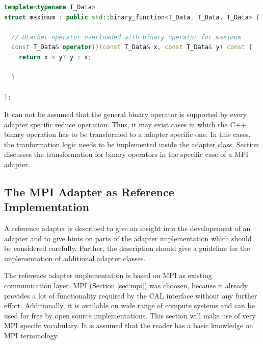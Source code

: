 \begin{lstlisting}[language=C++, breaklines=false, label={lst:binary_function}]
template<typename T_Data>
struct maximum : public std::binary_function<T_Data, T_Data, T_Data> {

  // Bracket operator overloaded with binary operator for maximum
  const T_Data& operator()(const T_Data& x, const T_Data& y) const {
    return x < y? y : x;

  }

};
\end{lstlisting}

It can not be assumed that the general binary operator is supported by
every adapter specific reduce operation.  Thus, it may exist cases in
which the C++ binary operation has to be transformed to a adapter
specific one. In this cases, the tranformation logic needs to be
implemented inside the adapter class. Section \label{sec:bin_operator}
discusses the transformation for binary operators in the specific case
of a MPI adapter.

\subsection{The MPI Adapter as Reference Implementation}
\label{sec:cal_mpi_adapter}

A reference adapter is described to give an insight into the
developement of an adapter and to give hints on parts of the adapter
implementation which should be considered carefully.  Further, the
description should give a guideline for the implementation of
additional adapter classes.

The reference adapter implementation is based on MPI as existing
communication layer.  MPI (Section \ref{sec:mpi}) was choosen,
because it already provides a lot of functionality required by the CAL
interface without any further effort. Additionally, it is available on wide range
of compute systems and can be used for free by open source
implementations. This section will make use of very MPI specifc 
vocabulary. It is assumed that the reader has a basic knowledge
on MPI terminology.


